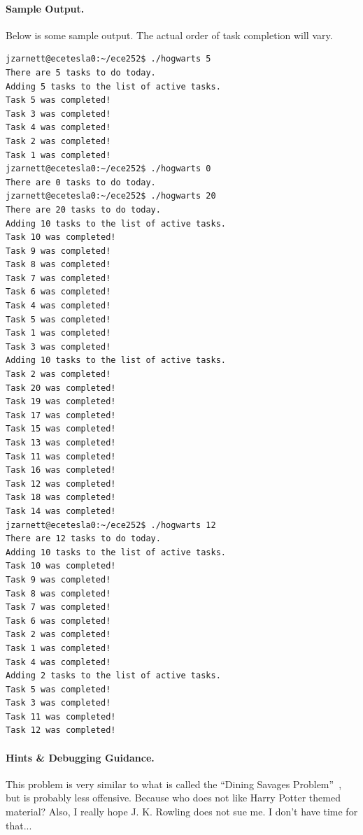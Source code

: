 \documentclass[a4paper]{report}
\begin{document}
\paragraph{Sample Output.} Below is some sample output. The actual order of task completion will vary.
{\small
\begin{verbatim}
jzarnett@ecetesla0:~/ece252$ ./hogwarts 5
There are 5 tasks to do today.
Adding 5 tasks to the list of active tasks.
Task 5 was completed!
Task 3 was completed!
Task 4 was completed!
Task 2 was completed!
Task 1 was completed!
jzarnett@ecetesla0:~/ece252$ ./hogwarts 0
There are 0 tasks to do today.
jzarnett@ecetesla0:~/ece252$ ./hogwarts 20
There are 20 tasks to do today.
Adding 10 tasks to the list of active tasks.
Task 10 was completed!
Task 9 was completed!
Task 8 was completed!
Task 7 was completed!
Task 6 was completed!
Task 4 was completed!
Task 5 was completed!
Task 1 was completed!
Task 3 was completed!
Adding 10 tasks to the list of active tasks.
Task 2 was completed!
Task 20 was completed!
Task 19 was completed!
Task 17 was completed!
Task 15 was completed!
Task 13 was completed!
Task 11 was completed!
Task 16 was completed!
Task 12 was completed!
Task 18 was completed!
Task 14 was completed!
jzarnett@ecetesla0:~/ece252$ ./hogwarts 12
There are 12 tasks to do today.
Adding 10 tasks to the list of active tasks.
Task 10 was completed!
Task 9 was completed!
Task 8 was completed!
Task 7 was completed!
Task 6 was completed!
Task 2 was completed!
Task 1 was completed!
Task 4 was completed!
Adding 2 tasks to the list of active tasks.
Task 5 was completed!
Task 3 was completed!
Task 11 was completed!
Task 12 was completed!
\end{verbatim}
}


\paragraph{Hints \& Debugging Guidance.}
This problem is very similar to what is called the ``Dining Savages Problem''~\cite{lbs}, but is probably less offensive. Because who does not like Harry Potter themed material? Also, I really hope J. K. Rowling does not sue me. I don't have time for that...
\end{document}

